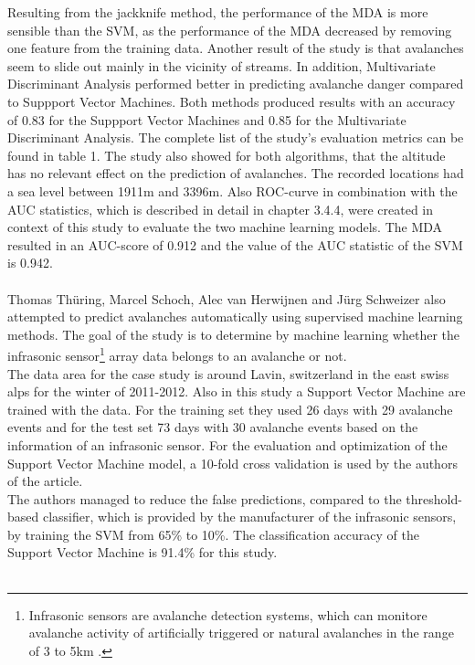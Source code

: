 \documentclass[../masterarbeit.tex]{subfiles}
\begin{document}
Resulting from the jackknife method, the performance of the MDA is more sensible than the SVM, as the performance of the MDA decreased by removing one feature from the training data. Another result of the study is that avalanches seem to slide out mainly in the vicinity of streams. In addition, Multivariate Discriminant Analysis performed better in predicting avalanche danger compared to Suppport Vector Machines. Both methods produced results with an accuracy of 0.83 for the Suppport Vector Machines and 0.85 for the Multivariate Discriminant Analysis. The complete list of the study's evaluation metrics can be found in table 1.
The study also showed for both algorithms, that the altitude has no relevant effect on the prediction of avalanches. The recorded locations had a sea level between 1911m and 3396m. Also ROC-curve in combination with the AUC statistics, which is described in detail in chapter 3.4.4, were created in context of this study to evaluate the two machine learning models. The MDA resulted in an AUC-score of 0.912 and the value of the AUC statistic of the SVM is 0.942. \autocite[]{Bahram:2019} \\~\\

Thomas Thüring, Marcel Schoch, Alec van Herwijnen and Jürg Schweizer \textcite[]{THURING201560} also attempted to predict avalanches automatically using supervised machine learning methods. The goal of the study is to determine by machine learning whether the infrasonic sensor\footnote{Infrasonic sensors are avalanche detection systems, which can monitore avalanche activity of artificially triggered or natural avalanches in the range of 3 to 5km \textcite[]{wyssenavalanche:2022}. } array data belongs to an avalanche or not. \autocite[]{THURING201560} \\
The data area for the case study is around Lavin, switzerland in the east swiss alps for the winter of 2011-2012. Also in this study a Support Vector Machine are trained with the data. For the training set they used 26 days with 29 avalanche events and for the test set 73 days with 30 avalanche events based on the information of an infrasonic sensor. For the evaluation and optimization of the Support Vector Machine model, a 10-fold cross validation is used by the authors of the article. \autocite[]{THURING201560} \\
The authors managed to reduce the false predictions, compared to the threshold-based classifier, which is provided by the manufacturer of the infrasonic sensors, by training the SVM from 65\% to 10\%. The classification accuracy of the Support Vector Machine is 91.4\% for this study.  \autocite[]{THURING201560} \\~\\
\end{document}
